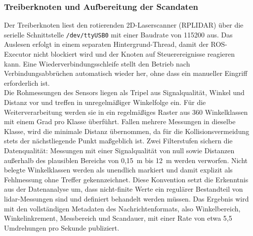 \subsubsection{Treiberknoten und Aufbereitung der Scandaten}
Der Treiberknoten liest den rotierenden 2D-Laserscanner (RPLIDAR) über die serielle Schnittstelle \texttt{/dev/ttyUSB0} mit einer Baudrate von 115200 aus. Das Auslesen erfolgt in einem separaten Hintergrund-Thread, damit der ROS-Executor nicht blockiert wird und der Knoten auf Steuerereignisse reagieren kann. Eine Wiederverbindungsschleife stellt den Betrieb nach Verbindungsabbrüchen automatisch wieder her, ohne dass ein manueller Eingriff erforderlich ist.
\\
Die Rohmessungen des Sensors liegen als Tripel aus Signalqualität, Winkel und Distanz vor und treffen in unregelmäßiger Winkelfolge ein. Für die Weiterverarbeitung werden sie in ein regelmäßiges Raster aus 360 Winkelklassen mit einem Grad pro Klasse überführt. Fallen mehrere Messungen in dieselbe Klasse, wird die minimale Distanz übernommen, da für die Kollisionsvermeidung stets der nächstliegende Punkt maßgeblich ist. Zwei Filterstufen sichern die Datenqualität: Messungen mit einer Signalqualität von null sowie Distanzen außerhalb des plausiblen Bereichs von 0,15~m bis 12~m werden verworfen. Nicht belegte Winkelklassen werden als unendlich markiert und damit explizit als Fehlmessung ohne Treffer gekennzeichnet. Diese Konvention setzt die Erkenntnis aus der Datenanalyse um, dass nicht-finite Werte ein regulärer Bestandteil von \gls{lidar}-Messungen sind und definiert behandelt werden müssen. Das Ergebnis wird mit den vollständigen Metadaten des Nachrichtenformats, also Winkelbereich, Winkelinkrement, Messbereich und Scandauer, mit einer Rate von etwa 5,5 Umdrehungen pro Sekunde publiziert.


